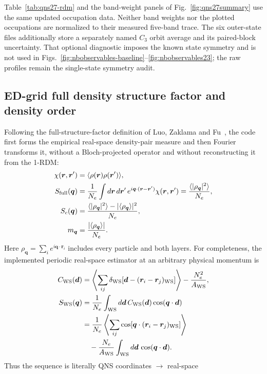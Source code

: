 Table~\ref{tab:qns27-rdm} and the band-weight panels of
Fig.~\ref{fig:qns27summary} use the same updated occupation data.
Neither band weights nor the plotted occupations are normalized to their
measured five-band trace. The six outer-state files additionally store
a separately named $C_3$ orbit average and its paired-block uncertainty.
That optional diagnostic imposes the known state symmetry and is not used
in Figs.~\ref{fig:nbobservables-baseline}--\ref{fig:nbobservables23};
the raw profiles remain the single-state symmetry audit.

\subsection{ED-grid full density structure factor and density order}

Following the full-structure-factor definition of Luo, Zaklama and
Fu~\cite{luo}, the code first forms the empirical real-space density-pair
measure and then Fourier transforms it, without a Bloch-projected operator and
without reconstructing it from the 1-RDM:
\begin{align}
 \chi(\bm r,\bm r')&=\langle\rho(\bm r)\rho(\bm r')\rangle,\\
 S_{\rm full}(\bm q)&=\frac1{N_e}\int d\bm r\,d\bm r'\,
 e^{i\bm q\cdot(\bm r-\bm r')}\chi(\bm r,\bm r')
 =\frac{\langle|\rho_{\bm q}|^2\rangle}{N_e},\\
 S_c(\bm q)&=\frac{\langle|\rho_{\bm q}|^2\rangle-
 |\langle\rho_{\bm q}\rangle|^2}{N_e},\\
 m_{\bm q}&=\frac{|\langle\rho_{\bm q}\rangle|}{N_e}.
\end{align}
Here $\rho_{\bm q}=\sum_i e^{i\bm q\cdot\bm r_i}$ includes every particle and
both layers. For completeness, the implemented periodic real-space estimator
at an arbitrary physical momentum is
\begin{align}
 C_{\rm WS}(\bm d)&=
 \left\langle\sum_{ij}\delta_{\rm WS}
 [\bm d-(\bm r_i-\bm r_j)_{\rm WS}]\right\rangle
 -\frac{N_e^2}{A_{\rm WS}},\\
 S_{\rm WS}(\bm q)&=\frac{1}{N_e}\int_{\rm WS}d\bm d\,
 C_{\rm WS}(\bm d)\cos(\bm q\cdot\bm d)\\
 &=\frac1{N_e}\left\langle\sum_{ij}
 \cos[\bm q\cdot(\bm r_i-\bm r_j)_{\rm WS}]\right\rangle\nonumber\\
 &\quad
 -\frac{N_e}{A_{\rm WS}}\int_{\rm WS}d\bm d\,
 \cos(\bm q\cdot\bm d).
\label{eq:ws-structure-factor}
\end{align}
Thus the sequence is literally QNS coordinates $\rightarrow$ real-space

